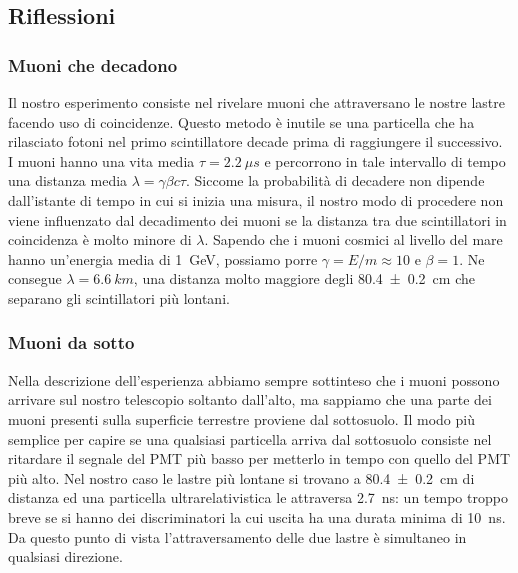 \subsection{Riflessioni} 

\subsubsection{Muoni che decadono}

Il nostro esperimento consiste nel rivelare muoni che attraversano le nostre lastre facendo uso di coincidenze. Questo metodo è inutile se una particella che ha rilasciato fotoni nel primo scintillatore decade prima di raggiungere il successivo.  I muoni hanno una vita media $\tau=\SI{2.2}{\mu s}$ e percorrono in tale intervallo di tempo una distanza media $\lambda=\gamma\beta c\tau$. Siccome la probabilità di decadere non dipende dall'istante di tempo in cui si inizia una misura, il nostro modo di procedere non viene influenzato dal decadimento dei muoni se la distanza tra due scintillatori in coincidenza è molto minore di $\lambda$. Sapendo che i muoni cosmici al livello del mare hanno un'energia media di \SI{1}{GeV}, possiamo porre $\gamma=E/m\approx10$ e $\beta=1$. Ne consegue $\lambda=\SI{6.6}{km}$, una distanza molto maggiore degli \SI{80.4\pm0.2}{cm} che separano gli scintillatori più lontani.

\subsubsection{Muoni da sotto}

Nella descrizione dell'esperienza abbiamo sempre sottinteso che i muoni possono arrivare sul nostro telescopio soltanto dall'alto, ma sappiamo che una parte dei muoni presenti sulla superficie terrestre proviene dal sottosuolo.
Il modo più semplice per capire se una qualsiasi particella arriva dal sottosuolo consiste nel ritardare il segnale del PMT più basso per metterlo in tempo con quello del PMT più alto. Nel nostro caso le lastre più lontane si trovano a \SI{80.4\pm0.2}{cm} di distanza ed una particella ultrarelativistica le attraversa \SI{2.7}{ns}: un tempo troppo breve se si hanno dei discriminatori la cui uscita ha una durata minima di \SI{10}{ns}. Da questo punto di vista l'attraversamento delle due lastre è simultaneo in qualsiasi direzione.

